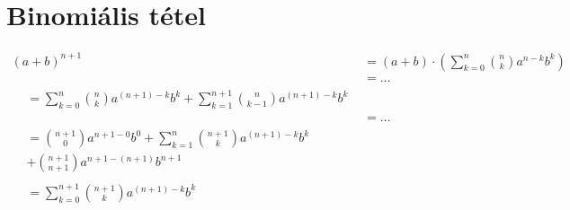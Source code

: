 \documentclass{article}
\begin{document}
\section{Binomiális tétel}
\begin{subequations}
\begin{align}
(a+b)^{n+1}
&= (a+b) \cdot \left( \sum_{k=0}^n \binom{n}{k} a^{n-k}b^k \right)\\
\nonumber &=\hdots\\
\begin{split}
&= \sum_{k=0}^n \binom{n}{k} a^{(n+1)-k}b^k
+ \sum_{k=1}^{n+1} \binom{n}{k-1} a^{(n+1)-k}b^{k}
\end{split}\\
\nonumber &=\hdots\\
\begin{split}
&= \binom{n+1}{0} a^{n+1-0} b^0
+ \sum_{k=1}^n \binom{n+1}{k} a^{(n+1)-k}b^k\\ 
&+ \binom{n+1}{n+1} a^{n+1-(n+1)} b^{n+1}
\end{split}\\
\begin{split}
&= \sum_{k=0}^{n+1} \binom{n+1}{k} a^{(n+1)-k}b^k
\end{split}
\end{align} 

\end{subequations}
\end{document}
